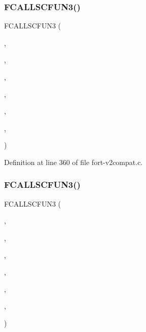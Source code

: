\subsubsection{\texorpdfstring{F\+C\+A\+L\+L\+S\+C\+F\+U\+N3()}{FCALLSCFUN3()}\hspace{0.1cm}{\footnotesize\ttfamily [3/4]}}
{\footnotesize\ttfamily F\+C\+A\+L\+L\+S\+C\+F\+U\+N3 (\begin{DoxyParamCaption}\item[{\hyperlink{ncfortran_8h_aec6fe8ae8c73cf5133d4ed64f86ff028}{N\+F\+\_\+\+I\+NT}}]{,  }\item[{\hyperlink{nf__v2compat_8c_a2703871d71535d87576288d6b0bd5727}{c\+\_\+ncdid}}]{,  }\item[{N\+C\+D\+ID}]{,  }\item[{\hyperlink{nf__fortv2_8f90_ac39b06f8d9b6ca78ff6073608ac25115}{ncdid}}]{,  }\item[{N\+C\+ID}]{,  }\item[{S\+T\+R\+I\+NG}]{,  }\item[{\hyperlink{fort-v2compat_8c_ae2352f39cbd25bcaf1bedbbb12db73fe}{P\+R\+C\+O\+DE}}]{ }\end{DoxyParamCaption})}



Definition at line 360 of file fort-\/v2compat.\+c.

\mbox{\label{fort-v2compat_8c_ac5ab32a0784330630289e8d13c10f79e}} 
\subsubsection{\texorpdfstring{F\+C\+A\+L\+L\+S\+C\+F\+U\+N3()}{FCALLSCFUN3()}\hspace{0.1cm}{\footnotesize\ttfamily [4/4]}}
{\footnotesize\ttfamily F\+C\+A\+L\+L\+S\+C\+F\+U\+N3 (\begin{DoxyParamCaption}\item[{\hyperlink{ncfortran_8h_aec6fe8ae8c73cf5133d4ed64f86ff028}{N\+F\+\_\+\+I\+NT}}]{,  }\item[{\hyperlink{nf__v2compat_8c_a9f5d347c65de290ab045b062ac4366f7}{c\+\_\+ncvid}}]{,  }\item[{N\+C\+V\+ID}]{,  }\item[{\hyperlink{nf__fortv2_8f90_aea3eb70885317451ef241b6feacb8893}{ncvid}}]{,  }\item[{N\+C\+ID}]{,  }\item[{S\+T\+R\+I\+NG}]{,  }\item[{\hyperlink{fort-v2compat_8c_ae2352f39cbd25bcaf1bedbbb12db73fe}{P\+R\+C\+O\+DE}}]{ }\end{DoxyParamCaption})}



